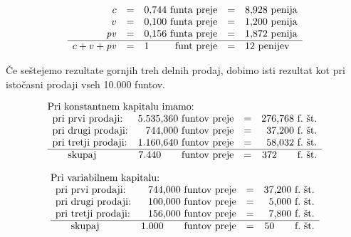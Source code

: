 \documentclass[kapital_02.tex]{subfiles}
\begin{document}
\[
    \begin{array}{r c c c l}
        c & = & \textrm{0,744 funta preje} & = & \textrm{8,928 penija} \\
        v & = & \textrm{0,100 funta preje} & = & \textrm{1,200 penija} \\
        \mathit{pv} & = & \textrm{0,156 funta preje} & = & \textrm{1,872 penija} \\
        \hline
        c + v + \mathit{pv} & = & \textrm{1 } \phantom{--.} \textrm{funt preje} & = & \textrm{12 penijev} \\
    \end{array}
\]

Če seštejemo rezultate gornjih treh delnih prodaj, dobimo isti rezultat kot pri istočasni prodaji vseh 10.000 funtov.

\[
    \begin{array}{l}
        \textrm{Pri konstantnem kapitalu imamo:} \\
        \begin{array}{l r c r}
            \textrm{pri prvi prodaji:} & \textrm{5.535,360 funtov preje} & = & \textrm{276,768~f.~št.} \\
            \textrm{pri drugi prodaji:} & \textrm{744,000 funtov preje} & = & \textrm{37,200~f.~št.} \\
            \textrm{pri tretji prodaji:} & \textrm{1.160,640 funtov preje} & = & \textrm{58,032~f.~št.} \\
            \hline
            \phantom{--} \textrm{skupaj} & \textrm{7.440} \phantom{--} \thinspace \thinspace \thinspace \textrm{funtov preje} & = & \textrm{372} \phantom{--} \thinspace \textrm{~f.~št.} \\
        \end{array} \\
    \end{array}
\]

\[
    \begin{array}{l}
        \textrm{Pri variabilnem kapitalu:} \\
        \begin{array}{l r c r}
            \textrm{pri prvi prodaji:} & \textrm{744,000 funtov preje} & = & \textrm{37,200~f.~št.} \\
            \textrm{pri drugi prodaji:} & \textrm{100,000 funtov preje} & = & \textrm{5,000~f.~št.} \\
            \textrm{pri tretji prodaji:} & \textrm{156,000 funtov preje} & = & \textrm{7,800~f.~št.} \\
            \hline
            \phantom{--} \textrm{skupaj} & \textrm{1.000} \phantom{--} \thinspace \thinspace \thinspace \textrm{funtov preje} & = & \textrm{50} \phantom{--} \thinspace \textrm{~f.~št.} \\
        \end{array} \\
    \end{array}
\]
\end{document}
